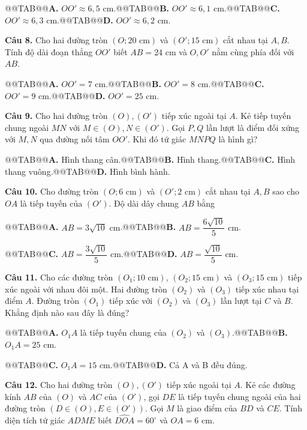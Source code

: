 \documentclass[11pt,a4paper]{article}
\begin{document}
@@TAB@@\textbf{A.} $OO' \approx 6{,}5\text{ cm}$.@@TAB@@\textbf{B.} $OO' \approx 6{,}1\text{ cm}$.@@TAB@@\textbf{C.} $OO' \approx 6{,}3\text{ cm}$.@@TAB@@\textbf{D.} $OO' \approx 6{,}2\text{ cm}$.

\textbf{Câu 8.} Cho hai đường tròn $(O; 20\text{ cm})$ và $(O'; 15\text{ cm})$ cắt nhau tại $A, B$. Tính độ dài đoạn thẳng $OO'$ biết $AB = 24\text{ cm}$ và $O, O'$ nằm cùng phía đối với $AB$.

@@TAB@@\textbf{A.} $OO' = 7\text{ cm}$.@@TAB@@\textbf{B.} $OO' = 8\text{ cm}$.@@TAB@@\textbf{C.} $OO' = 9\text{ cm}$.@@TAB@@\textbf{D.} $OO' = 25\text{ cm}$.

\textbf{Câu 9.} Cho hai đường tròn $(O), (O')$ tiếp xúc ngoài tại $A$. Kẻ tiếp tuyến chung ngoài $MN$ với $M \in (O), N \in (O')$. Gọi $P, Q$ lần lượt là điểm đối xứng với $M, N$ qua đường nối tâm $OO'$. Khi đó tứ giác $MNPQ$ là hình gì?

@@TAB@@\textbf{A.} Hình thang cân.@@TAB@@\textbf{B.} Hình thang.@@TAB@@\textbf{C.} Hình thang vuông.@@TAB@@\textbf{D.} Hình bình hành.

\textbf{Câu 10.} Cho đường tròn $(O; 6\text{ cm})$ và $(O'; 2\text{ cm})$ cắt nhau tại $A, B$ sao cho $OA$ là tiếp tuyến của $(O')$. Độ dài dây chung $AB$ bằng

@@TAB@@\textbf{A.} $AB = 3\sqrt{10}\text{ cm}$.@@TAB@@\textbf{B.} $AB = \dfrac{6\sqrt{10}}{5}\text{ cm}$.

@@TAB@@\textbf{C.} $AB = \dfrac{3\sqrt{10}}{5}\text{ cm}$.@@TAB@@\textbf{D.} $AB = \dfrac{\sqrt{10}}{5}\text{ cm}$.

\textbf{Câu 11.} Cho các đường tròn $(O_1; 10\text{ cm})$, $(O_2; 15\text{ cm})$ và $(O_3; 15\text{ cm})$ tiếp xúc ngoài với nhau đôi một. Hai đường tròn $(O_2)$ và $(O_3)$ tiếp xúc nhau tại điểm $A$. Đường tròn $(O_1)$ tiếp xúc với $(O_2)$ và $(O_3)$ lần lượt tại $C$ và $B$. Khẳng định nào sau đây là đúng?

@@TAB@@\textbf{A.} $O_1A$ là tiếp tuyến chung của $(O_2)$ và $(O_3)$.@@TAB@@\textbf{B.} $O_1A = 25\text{ cm}$.

@@TAB@@\textbf{C.} $O_1A = 15\text{ cm}$.@@TAB@@\textbf{D.} Cả A và B đều đúng.

\textbf{Câu 12.} Cho hai đường tròn $(O), (O')$ tiếp xúc ngoài tại $A$. Kẻ các đường kính $AB$ của $(O)$ và $AC$ của $(O')$, gọi $DE$ là tiếp tuyến chung ngoài của hai đường tròn $(D \in (O), E \in (O'))$. Gọi $M$ là giao điểm của $BD$ và $CE$. Tính diện tích tứ giác $ADME$ biết $\widehat{DOA} = 60^\circ$ và $OA = 6\text{ cm}$.
\end{document}

